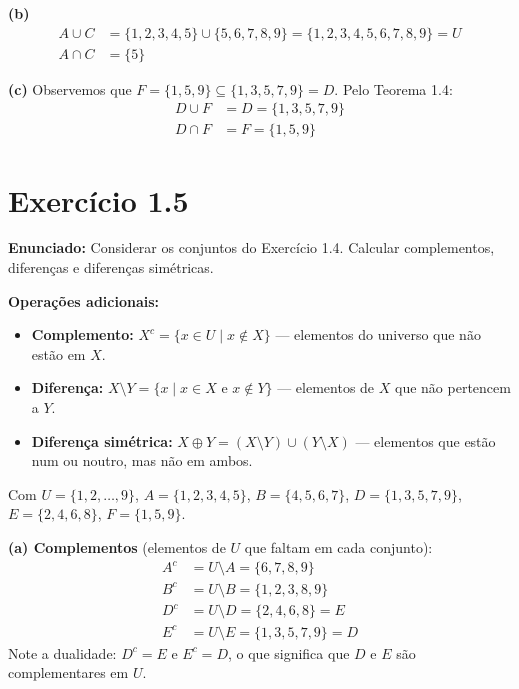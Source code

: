 \documentclass[12pt,a4paper]{article}
\begin{document}
\textbf{(b)}
\begin{align*}
A \cup C &= \{1,2,3,4,5\} \cup \{5,6,7,8,9\} = \{1,2,3,4,5,6,7,8,9\} = U \\
A \cap C &= \{5\}
\end{align*}

\textbf{(c)} Observemos que $F = \{1,5,9\} \subseteq \{1,3,5,7,9\} = D$. Pelo Teorema 1.4:
\begin{align*}
D \cup F &= D = \{1,3,5,7,9\} \\
D \cap F &= F = \{1,5,9\}
\end{align*}

\section*{Exercício 1.5}

\textbf{Enunciado:} Considerar os conjuntos do Exercício 1.4. Calcular complementos, diferenças e diferenças simétricas.

\begin{teoribox}
\textbf{Operações adicionais:}
\begin{itemize}
  \item \textbf{Complemento:} $X^c = \{x \in U \mid x \notin X\}$ --- elementos do universo que não estão em $X$.
  \item \textbf{Diferença:} $X \setminus Y = \{x \mid x \in X \text{ e } x \notin Y\}$ --- elementos de $X$ que não pertencem a $Y$.
  \item \textbf{Diferença simétrica:} $X \oplus Y = (X \setminus Y) \cup (Y \setminus X)$ --- elementos que estão num ou noutro, mas não em ambos.
\end{itemize}
\end{teoribox}

Com $U = \{1,2,\ldots,9\}$, $A=\{1,2,3,4,5\}$, $B=\{4,5,6,7\}$, $D=\{1,3,5,7,9\}$, $E=\{2,4,6,8\}$, $F=\{1,5,9\}$.

\textbf{(a) Complementos} (elementos de $U$ que faltam em cada conjunto):
\begin{align*}
A^c &= U \setminus A = \{6,7,8,9\} \\
B^c &= U \setminus B = \{1,2,3,8,9\} \\
D^c &= U \setminus D = \{2,4,6,8\} = E \\
E^c &= U \setminus E = \{1,3,5,7,9\} = D
\end{align*}
Note a dualidade: $D^c = E$ e $E^c = D$, o que significa que $D$ e $E$ são complementares em $U$.
\end{document}
